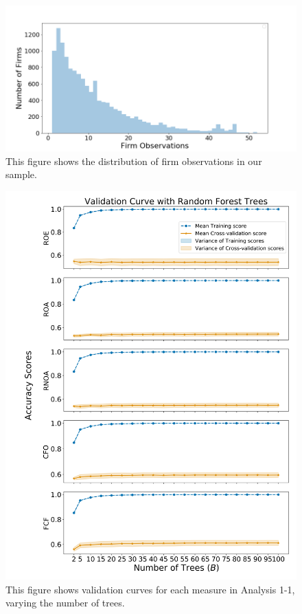 \begin{figure}
    \centering
    \includegraphics[width=\textwidth,height=0.87\textheight,keepaspectratio]{figures/ABIS/FirmObs.png}

   \caption{This figure shows the distribution of firm observations in our sample.}
      \label{fig:FirmObs}
\end{figure}


\begin{figure}[htb!]
    \centering
    \includegraphics[width=\textwidth,height=0.87\textheight,keepaspectratio]{figures/ABIS/analysis_1-1_ValidationCurveTrees.png}

   \caption{This figure shows validation curves for each measure in Analysis 1-1, varying the number of trees. }
      \label{fig:ValidationCurve-A1-Trees}
\end{figure}

